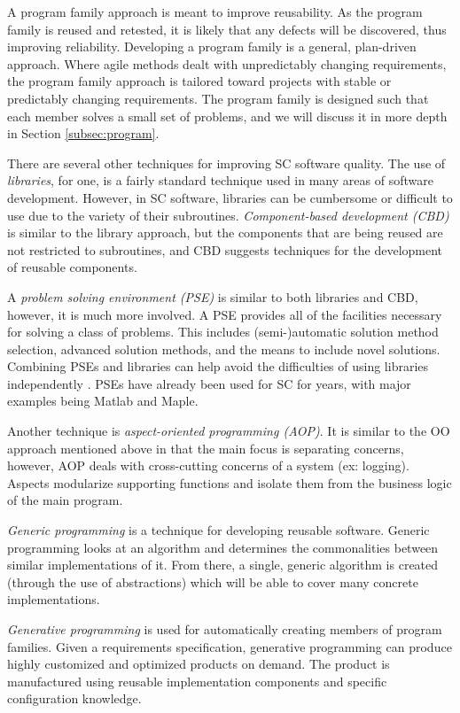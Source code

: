 \documentclass[10pt, preprint]{sigplanconf}
\begin{document}
A program family approach is meant to improve reusability. As the program family
is reused and retested, it is likely that any defects will be discovered, thus
improving reliability. Developing a program family is a general, plan-driven
approach. Where agile methods dealt with unpredictably changing requirements,
the program family approach is tailored toward projects with stable or
predictably changing requirements. The program family is designed such that each
member solves a small set of problems, and we will discuss it in more depth in
Section \ref{subsec:program}. %

There are several other techniques for improving SC software quality. The use of
\textit{libraries}, for one, is a fairly standard technique used in many areas
of software development. However, in SC software, libraries can be cumbersome or
difficult to use due to the variety of their
subroutines. \textit{Component-based development (CBD)} is similar to the
library approach, but the components that are being reused are not restricted to
subroutines, and CBD suggests techniques for the development of reusable
components.

A \textit{problem solving environment (PSE)} is similar to both libraries and
CBD, however, it is much more involved. A PSE provides all of the facilities
necessary for solving a class of problems. This includes (semi-)automatic
solution method selection, advanced solution methods, and the means to include
novel solutions. Combining PSEs and libraries can help avoid the difficulties of
using libraries independently \cite{RiceAndBoisvert1996}. PSEs have already been
used for SC for years, with major examples being Matlab and Maple.

Another technique is \textit{aspect-oriented programming (AOP)}. It is similar
to the OO approach mentioned above in that the main focus is separating
concerns, however, AOP deals with cross-cutting concerns of a system (ex:
logging). Aspects modularize supporting functions and isolate them from the
business logic of the main program.

\textit{Generic programming} is a technique for developing reusable
software. Generic programming looks at an algorithm and determines the
commonalities between similar implementations of it. From there, a single,
generic algorithm is created (through the use of abstractions) which will be
able to cover many concrete implementations.

\textit{Generative programming} is used for automatically creating members of
program families. Given a requirements specification, generative programming can
produce highly customized and optimized products on demand. The product is
manufactured using reusable implementation components and specific configuration
knowledge.
\end{document}

